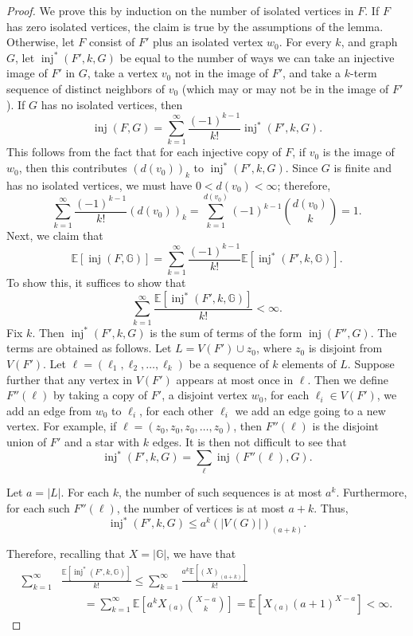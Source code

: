 \documentclass{amsart}
\numberwithin{equation}{section}
\numberwithin{figure}{section}
\theoremstyle{definition}
\theoremstyle{remark}
\DeclareMathOperator{\inj}{inj}
\newcommand{\EE}{\mathbb{E}}
\begin{document}
\begin{proof}
We prove this by induction on the number of isolated vertices in $F$. If $F$
has zero isolated vertices, the claim is true by the assumptions of the
lemma. Otherwise, let $F$ consist of $F'$ plus an isolated vertex $w_0$. For
every $k$, and graph $G$, let $\inj^*(F',k,G)$ be equal to the number of ways
we can take an injective image of $F'$ in $G$, take a vertex $v_0$ not in the
image of $F'$, and take a $k$-term sequence of distinct neighbors of $v_0$
(which may or may not be in the image of $F'$). If $G$ has no isolated
vertices, then
\[
\inj(F,G)=\sum_{k=1}^\infty \frac{(-1)^{k-1}}{k!} \inj^*(F',k,G).
\]
This follows from the fact that for each injective copy of $F$, if $v_0$ is
the image of $w_0$, then this contributes $(d(v_0))_k$ to $\inj^*(F',k,G)$.
Since $G$ is finite and has no isolated vertices, we must have
$0<d(v_0)<\infty$; therefore,
\[\sum_{k=1}^\infty \frac{(-1)^{k-1}}{k!}(d(v_0))_k = \sum_{k=1}^{d(v_0)}
(-1)^{k-1}\binom{d(v_0)}{k}=1
.\]
Next, we claim that
\[
\EE[\inj(F,\mathbb{G})]=\sum_{k=1}^\infty \frac{(-1)^{k-1}}{k!}\EE[\inj^*(F',k,\mathbb{G})].
\]
To show this, it suffices to show that
\[
\sum_{k=1}^\infty \frac{\EE[\inj^*(F',k,\mathbb{G})]}{k!}<\infty.
\]
Fix $k$. Then $\inj^*(F',k,G)$ is the sum of terms of the form $\inj(F'',G)$.
The terms are obtained as follows. Let $L=V(F') \cup z_0$, where $z_0$ is
disjoint from $V(F')$. Let $\ell=(\ell_1,\ell_2,\dots,\ell_k)$ be a sequence
of $k$ elements of $L$. Suppose further that any vertex in $V(F')$ appears at
most once in $\ell$. Then we define $F''(\ell)$ by taking a copy of $F'$, a
disjoint vertex $w_0$, for each $\ell_i \in V(F')$, we add an edge from $w_0$
to $\ell_i$, for each other $\ell_i$ we add an edge going to a new vertex. For example, if $\ell=(z_0,z_0,z_0,\dots,z_0)$, then $F''(\ell)$ is the
disjoint union of $F'$ and a star with $k$ edges. It is then not difficult to
see that
\[
\inj^*(F',k,G)=\sum_\ell \inj(F''(\ell),G).
\]

Let $a=|L|$. For each $k$, the number of such sequences is at most $a^k$.
Furthermore, for each such $F''(\ell)$, the number of vertices is at most
$a+k$. Thus,
\[\inj^*(F',k,G) \le a^k (|V(G)|)_{(a+k)}.
\]

Therefore, recalling that $X=|\mathbb{G}|$, we have that
\begin{align*}
\sum_{k=1}^\infty &\frac{\EE[\inj^*(F',k,\mathbb{G})]}{k!}
\le \sum_{k=1}^\infty \frac{a^k \EE[(X)_{(a+k)}]}{k!}\\
&\qquad=\sum_{k=1}^\infty \EE \left[ a^k X_{(a)} \binom{X-a}{k}\right]
=\EE \left[X_{(a)} (a+1)^{X-a}\right]
<\infty.
\end{align*}


\end{proof}
\end{document}
